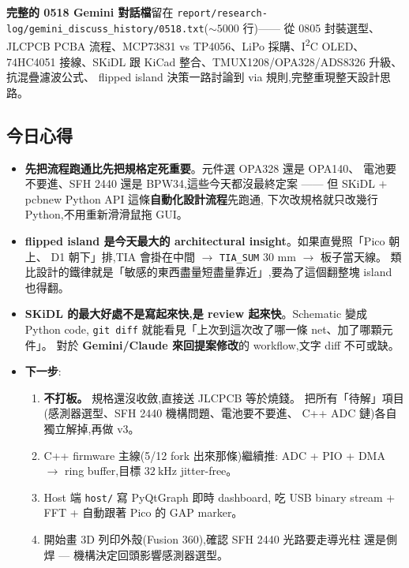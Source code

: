 \textbf{完整的 0518 Gemini 對話檔}留在
\texttt{report/research-log/gemini\_discuss\_history/0518.txt}(\(\sim 5000\) 行)——
從 0805 封裝選型、JLCPCB PCBA 流程、MCP73831 vs TP4056、LiPo 採購、I\textsuperscript{2}C OLED、
74HC4051 接線、SKiDL 跟 KiCad 整合、TMUX1208/OPA328/ADS8326 升級、抗混疊濾波公式、
flipped island 決策一路討論到 via 規則,完整重現整天設計思路。

\subsection*{今日心得}

\begin{itemize}[leftmargin=2em,itemsep=0pt]
  \item \textbf{先把流程跑通比先把規格定死重要}。元件選 OPA328 還是 OPA140、
        電池要不要進、SFH 2440 還是 BPW34,這些今天都沒最終定案 ——
        但 SKiDL \(+\) pcbnew Python API 這條\textbf{自動化設計流程}先跑通,
        下次改規格就只改幾行 Python,不用重新滑滑鼠拖 GUI。
  \item \textbf{flipped island 是今天最大的 architectural insight}。如果直覺照「Pico 朝上、
        D1 朝下」排,TIA 會掛在中間 \(\to\) \texttt{TIA\_SUM} 30 mm \(\to\) 板子當天線。
        類比設計的鐵律就是「敏感的東西盡量短盡量靠近」,要為了這個翻整塊 island 也得翻。
  \item \textbf{SKiDL 的最大好處不是寫起來快,是 review 起來快}。Schematic 變成 Python code,
        \texttt{git diff} 就能看見「上次到這次改了哪一條 net、加了哪顆元件」。
        對於 \textbf{Gemini/Claude 來回提案修改}的 workflow,文字 diff 不可或缺。
  \item \textbf{下一步}:
        \begin{enumerate}[leftmargin=2em,itemsep=0pt]
          \item \textbf{不打板。} 規格還沒收斂,直接送 JLCPCB 等於燒錢。
                把所有「待解」項目(感測器選型、SFH 2440 機構問題、電池要不要進、
                C++ ADC 鏈)各自獨立解掉,再做 v3。
          \item C++ firmware 主線(5/12 fork 出來那條)繼續推:
                ADC + PIO + DMA \(\to\) ring buffer,目標 \(\SI{32}{\kilo\hertz}\) jitter-free。
          \item Host 端 \texttt{host/} 寫 PyQtGraph 即時 dashboard,
                吃 USB binary stream + FFT + 自動跟著 Pico 的 GAP marker。
          \item 開始畫 3D 列印外殼(Fusion 360),確認 SFH 2440 光路要走導光柱
                還是側焊 — 機構決定回頭影響感測器選型。
        \end{enumerate}
\end{itemize}
